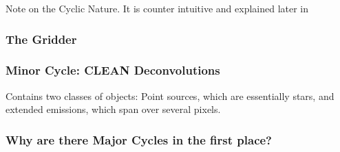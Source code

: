 Note on the Cyclic Nature. It is counter intuitive and explained later in 

\subsubsection{The Gridder}


\subsubsection{Minor Cycle: CLEAN Deconvolutions}
Contains two classes of objects: Point sources, which are essentially stars, and extended emissions, which span over several pixels.


\subsubsection{Why are there Major Cycles in the first place?}
